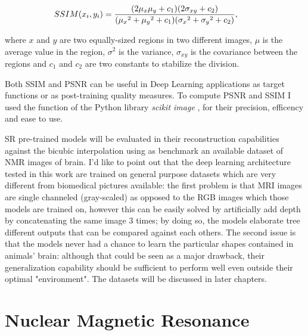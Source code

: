 \documentclass[12pt,a4paper]{report}
\begin{document}
 \begin{equation}
    \hspace{-0.75cm}
    SSIM(x_i, y_i) = \frac{(2\mu_x\mu_y + c_1)(2\sigma_{xy} + c_2)}{ ({\mu_x}^2 + {\mu_y}^2 + c_1)({\sigma_x}^2 + {\sigma_y}^2 + c_2) },
    \label{SSIM}
\end{equation}

where $x$ and $y$ are two equally-sized regions in two different images, $\mu$ is the average value in the region, $\sigma^2$ is the variance, $\sigma_{xy}$ is the covariance between the regions and $c_1$ and $c_2$ are two constants to stabilize the division.

Both SSIM and PSNR can be useful in Deep Learning applications as target functions or as post-training quality measures. 
To compute PSNR and SSIM I used the function of the Python library {\it scikit image} \cite{scikit}, for their precision, efficency and ease to use.

SR pre-trained models will be evaluated in their reconstruction capabilities against the bicubic interpolation using as benchmark an available dataset of NMR images of brain. 
I'd like to point out that the deep learning architecture tested in this work are trained  on general purpose datasets which are very different from biomedical pictures available:  the first problem is that MRI images are single channeled (gray-scaled) as opposed to the RGB images which those models are trained on, however this can be easily solved by artificially add depth by concatenating the same image 3 times; by doing so, the models elaborate tree different outputs that can be compared against each others.  
The second issue is that the models never had a chance to learn the particular shapes contained in animals' brain: although that could be seen as a major drawback, their generalization capability should be sufficient to perform well even outside their optimal "environment". 
The datasets will be discussed in later chapters.

\section{Nuclear Magnetic Resonance}
\end{document}
